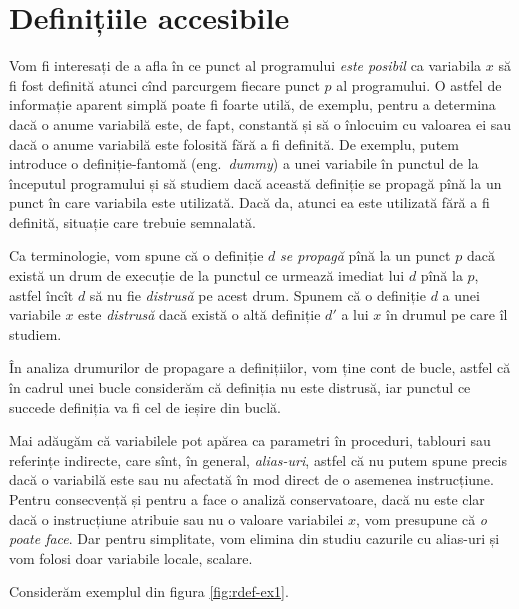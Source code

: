 
\chapter{Definițiile accesibile}

Vom fi interesați de a afla în ce punct al programului \emph{este posibil}
ca variabila $ x $ să fi fost definită atunci cînd parcurgem fiecare
punct $ p $ al programului. O astfel de informație aparent simplă poate fi
foarte utilă, de exemplu, pentru a determina dacă o anume variabilă este,
de fapt, constantă și să o înlocuim cu valoarea ei sau dacă o anume variabilă
este folosită fără a fi definită. De exemplu, putem introduce o
definiție-fantomă (eng.\ \emph{dummy}) a unei variabile în punctul de la
începutul programului și să studiem dacă această definiție se propagă pînă la
un punct în care variabila este utilizată. Dacă da, atunci ea este utilizată
fără a fi definită, situație care trebuie semnalată.

Ca terminologie, vom spune că o definiție $ d $ \emph{se propagă} pînă la
un punct $ p $ dacă există un drum de execuție de la punctul ce urmează imediat
lui $ d $ pînă la $ p $, astfel încît $ d $ să nu fie \emph{distrusă} pe acest
drum. Spunem că o definiție $ d $ a unei variabile $ x $ este \emph{distrusă}
dacă există o altă definiție $ d' $ a lui $ x $ în drumul pe care îl studiem.

\begin{remark}\label{rk:def-loop}
  În analiza drumurilor de propagare a definițiilor, vom ține cont de bucle,
  astfel că în cadrul unei bucle considerăm că definiția nu este distrusă,
  iar punctul ce succede definiția va fi cel de ieșire din buclă.
\end{remark}

Mai adăugăm că variabilele pot apărea ca parametri în proceduri, tablouri
sau referințe indirecte, care sînt, în general, \emph{alias-uri}, astfel că
nu putem spune precis dacă o variabilă este sau nu afectată în mod direct
de o asemenea instrucțiune. Pentru consecvență și pentru a face o analiză
conservatoare, dacă nu este clar dacă o instrucțiune atribuie sau nu o valoare
variabilei $ x $, vom presupune că \emph{o poate face}. Dar pentru simplitate,
vom elimina din studiu cazurile cu alias-uri și vom folosi doar variabile
locale, scalare.

Considerăm exemplul din figura \ref{fig:rdef-ex1}.

